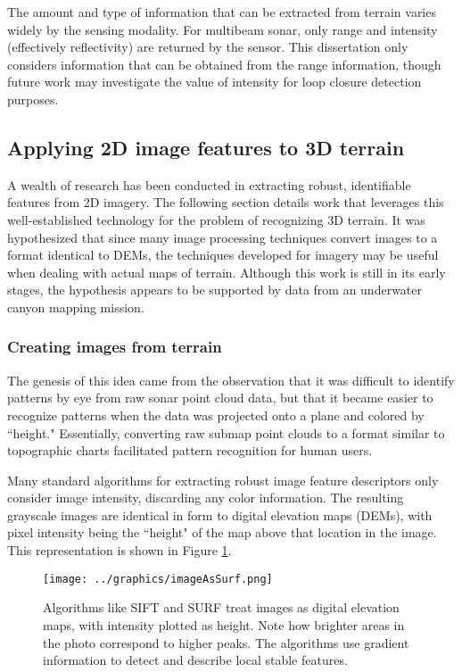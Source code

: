The amount and type of information that can be extracted from terrain varies widely by the sensing modality. For multibeam sonar, only range and intensity (effectively reflectivity) are returned by the sensor. This dissertation only considers information that can be obtained from the range information, though future work may investigate the value of intensity for loop closure detection purposes.

\subsection{Applying 2D image features to 3D terrain}

A wealth of research has been conducted in extracting robust, identifiable features from 2D imagery. The following section details work that leverages this well-established technology for the problem of recognizing 3D terrain. It was hypothesized that since many image processing techniques convert images to a format identical to DEMs, the techniques developed for imagery may be useful when dealing with actual maps of terrain.   Although this work is still in its early stages, the hypothesis appears to be supported by data from an underwater canyon mapping mission.

\subsubsection{Creating images from terrain}

The genesis of this idea came from the observation that it was difficult to identify patterns by eye from raw sonar point cloud data, but that it became easier to recognize patterns when the data was projected onto a plane and colored by ``height." Essentially, converting raw submap point clouds to a format similar to topographic charts facilitated pattern recognition for human users.

Many standard algorithms for extracting robust image feature descriptors only consider image intensity, discarding any color information. The resulting grayscale images are identical in form to digital elevation maps (DEMs), with pixel intensity being the ``height" of the map above that location in the image. This representation is shown in Figure \ref{fig:imAsSurf}. 

\begin{figure}[htb]
   \centering
   \texttt{[image: ../graphics/imageAsSurf.png]} %
   \caption{Algorithms like SIFT and SURF treat images as digital elevation maps, with intensity plotted as height. Note how brighter areas in the photo correspond to higher peaks. The algorithms use gradient information to detect and describe local stable features.}
   \label{fig:imAsSurf}
\end{figure}

